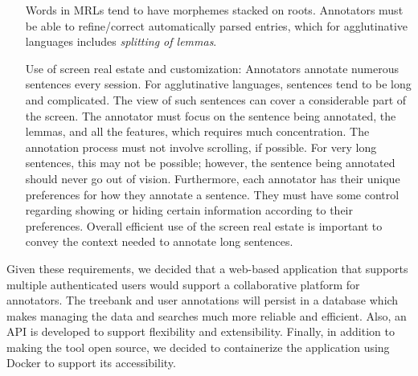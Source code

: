 \begin{itemize}[before=\normalfont, font=\itshape, align=left,noitemsep,topsep=0pt,parsep=3pt,partopsep=0pt,labelsep=3pt,align=left]
        Words in MRLs tend to have morphemes stacked on roots.
        Annotators must be able to refine/correct automatically parsed entries, which for agglutinative languages includes \textit{splitting of lemmas}.
    \item[Use of screen real estate and customization:]
        Annotators annotate numerous sentences every session.
        For agglutinative languages, sentences tend to be long and complicated.
        The view of such sentences can cover a considerable part of the screen.
        The annotator must focus on the sentence being annotated, the lemmas, and all the features, which requires much concentration.
        The annotation process must not involve scrolling, if possible.
        For very long sentences, this may not be possible; however, the sentence being annotated should never go out of vision.
        Furthermore, each annotator has their unique preferences for how they annotate a sentence.
        They must have some control regarding showing or hiding certain information according to their preferences.
        Overall efficient use of the screen real estate is important to convey the context needed to annotate long sentences.
\end{itemize}

Given these requirements, we decided that a web-based application that supports multiple authenticated users would support a collaborative platform for annotators.
The treebank and user annotations will persist in a database which makes managing the data and searches much more reliable and efficient.
Also, an API is developed to support flexibility and extensibility.
Finally, in addition to making the tool open source, we decided to containerize the application using Docker\cite{docker} to support its accessibility.
